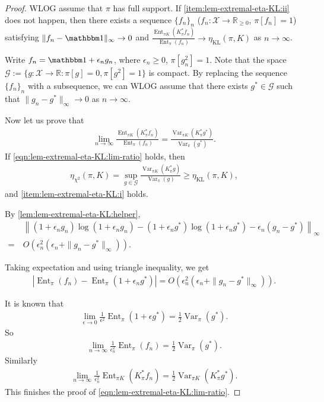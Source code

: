 \documentclass[11pt]{article}
\def\bR{\mathbb{R}}
\def\cG{\mathcal{G}}
\def\cX{\mathcal{X}}
\DeclareMathOperator\Var{\mathrm{Var}}
\DeclareMathOperator\Ent{\mathrm{Ent}}
\DeclareMathOperator\KL{\mathrm{KL}}
\theoremstyle{definition}
\begin{document}
\begin{proof}
  WLOG assume that $\pi$ has full support.
  If \cref{item:lem-extremal-eta-KL:ii} does not happen, then there exists a sequence $\{f_n\}_n$ ($f_n: \cX\to \bR_{\ge 0}$, $\pi[f_n]=1$) satisfying $\|f_n-\mathbbm1\|_\infty \to 0$ and $\frac{\Ent_{\pi K}(K_\pi^* f_n)}{\Ent_\pi(f_n)} \to \eta_{\KL}(\pi, K)$ as $n\to \infty$.

  Write $f_n = \mathbbm1+\epsilon_n g_n$, where $\epsilon_n\ge 0$, $\pi[g_n^2]=1$.
  Note that the space $\cG:=\{g: \cX \to \bR: \pi[g]=0, \pi[g^2]=1\}$ is compact.
  By replacing the sequence $\{f_n\}_n$ with a subsequence, we can WLOG assume that there exists $g^*\in \cG$ such that $\|g_n-g^*\|_\infty \to 0$ as $n\to \infty$.

  Now let us prove that
  \begin{align}
    \lim_{n\to \infty} \frac{\Ent_{\pi K}(K_\pi^* f_n)}{\Ent_\pi(f_n)} = \frac{\Var_{\pi K}(K_\pi^* g^*)}{\Var_\pi(g^*)}. \label{eqn:lem-extremal-eta-KL:lim-ratio}
  \end{align}
  If \cref{eqn:lem-extremal-eta-KL:lim-ratio} holds, then
  \begin{align}
    \eta_{\chi^2}(\pi, K) = \sup_{g\in \cG} \frac{\Var_{\pi K}(K_\pi^* g)}{\Var_\pi(g)} \ge \eta_{\KL}(\pi, K),
  \end{align}
  and \cref{item:lem-extremal-eta-KL:i} holds.

  By \cref{lem:lem-extremal-eta-KL:helper},
  \begin{align}
    &~ \left\|(1+\epsilon_n g_n) \log (1+\epsilon_n g_n) - (1+\epsilon_n g^*)\log(1+\epsilon_n g^*)  - \epsilon_n (g_n-g^*)\right\|_\infty\\
    \nonumber =&~ O\left(\epsilon_n^2 (\epsilon_n+\|g_n-g^*\|_\infty)\right).
  \end{align}

  Taking expectation and using triangle inequality, we get
  \begin{align}
    \left|\Ent_\pi(f_n) - \Ent_\pi(1+\epsilon_n g^*)\right| = O\left(\epsilon_n^2 (\epsilon_n+\|g_n-g^*\|_\infty)\right).
  \end{align}

  It is known that
  \begin{align}
    \lim_{\epsilon\to 0} \frac 1{\epsilon^2} \Ent_\pi(1+\epsilon g^*) = \frac 12 \Var_\pi(g^*).
  \end{align}
  So
  \begin{align}
    \lim_{n\to \infty} \frac 1{\epsilon_n^2} \Ent_\pi(f_n) = \frac 12\Var_\pi(g^*).
  \end{align}
  Similarly
  \begin{align}
    \lim_{n\to \infty} \frac 1{\epsilon_n^2} \Ent_{\pi K}(K_\pi^* f_n) = \frac 12\Var_{\pi K}(K_\pi^* g^*).
  \end{align}
  This finishes the proof of \cref{eqn:lem-extremal-eta-KL:lim-ratio}.
\end{proof}
\end{document}
